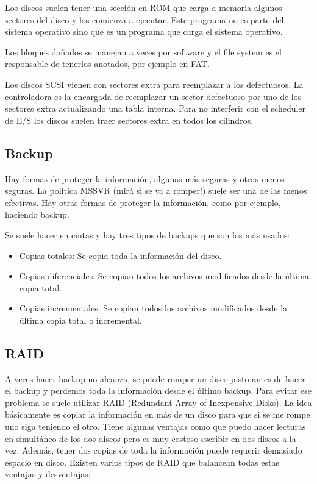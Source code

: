 \documentclass{article}
\begin{document}
Los discos suelen tener una secci\'on en ROM que carga a memoria algunos sectores del disco y los comienza a ejecutar. Este programa no es parte del sistema operativo sino que es un programa que carga el sistema operativo.

Los bloques da\~nados se manejan a veces por software y el file system es el responsable de tenerlos anotados, por ejemplo en FAT.

Los discos SCSI vienen con sectores extra para reemplazar a los defectuosos. La controladora es la encargada de reemplazar un sector defectuoso por uno de los sectores extra actualizando una tabla interna. Para no interferir con el scheduler de E/S los discos suelen traer sectores extra en todos los cilindros.

\subsection{Backup}

Hay formas de proteger la informaci\'on, algunas m\'as seguras y otras menos seguras. La pol\'itica MSSVR (mir\'a si se va a romper!) suele ser una de las menos efectivas. Hay otras formas de proteger la informaci\'on, como por ejemplo, haciendo backup.

Se suele hacer en cintas y hay tres tipos de backups que son los m\'as usados:

\begin{itemize}
\item Copias totales: Se copia toda la informaci\'on del disco.
\item Copias diferenciales: Se copian todos los archivos modificados desde la \'ultima copia total.		
\item Copias incrementales: Se copian todos los archivos modificados desde la \'ultima copia total o incremental.
\end{itemize}

\subsection{RAID}

A veces hacer backup no alcanza, se puede romper un disco justo antes de hacer el backup y perdemos toda la informaci\'on desde el \'ultimo backup. Para evitar ese problema se suele utilizar RAID (Redundant Array of Inexpensive Disks). La idea b\'asicamente es copiar la informaci\'on en m\'as de un disco para que si se me rompe uno siga teniendo el otro. Tiene algunas ventajas como que puedo hacer lecturas en simult\'aneo de los dos discos pero es muy costoso escribir en dos discos a la vez. Adem\'as, tener dos copias de toda la informaci\'on puede requerir demasiado espacio en disco. Existen varios tipos de RAID que balancean todas estas ventajas y desventajas:
\end{document}
